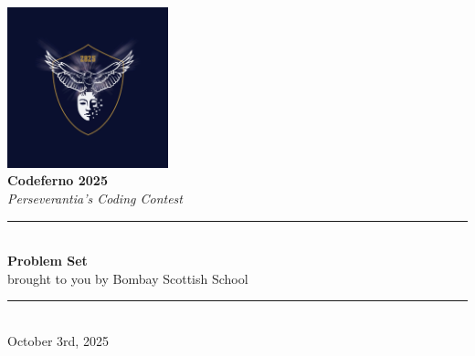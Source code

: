 \documentclass[12pt]{article}
\begin{document}
\pagestyle{empty}

\vspace*{2cm}

\begin{center}
    \includegraphics[width=0.35\textwidth]{perseverantia_logo.png} \\[2cm]

    {\Huge \bfseries Codeferno 2025}\\[0.5cm]
    {\large \textit{Perseverantia’s Coding Contest}}\\[1.5cm]

    \rule{0.6\textwidth}{0.4pt}\\[0.4cm]
    {\Large \bfseries Problem Set}\\[0.3cm]
    {\normalsize brought to you by Bombay Scottish School}\\[0.4cm]
    \rule{0.6\textwidth}{0.4pt}\\[3cm]

    {\large October 3rd, 2025}
\end{center}
\end{document}

